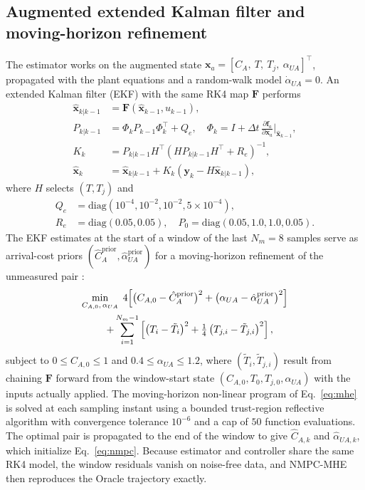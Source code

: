 \subsection{Augmented extended Kalman filter and moving-horizon refinement}
\label{subsec:mhe}
The estimator works on the augmented state $\mathbf{x}_a = [C_A,\ T,\ T_j,\ \alpha_{UA}]^\top$, propagated with the plant equations and a random-walk model $\dot\alpha_{UA} = 0$. An extended Kalman filter (EKF) with the same RK4 map $\mathbf{F}$ performs
\begin{align}
    \hat{\mathbf{x}}_{k|k-1} &= \mathbf{F}(\hat{\mathbf{x}}_{k-1}, u_{k-1}), \nonumber \\
    P_{k|k-1} &= \Phi_k P_{k-1} \Phi_k^\top + Q_e, \quad \Phi_k = I + \Delta t\,\frac{\partial \mathbf{f}_a}{\partial \mathbf{x}_a}\Big|_{\hat{\mathbf{x}}_{k-1}}, \nonumber \\
    K_k &= P_{k|k-1} H^\top \left(H P_{k|k-1} H^\top + R_e\right)^{-1}, \nonumber \\
    \hat{\mathbf{x}}_k &= \hat{\mathbf{x}}_{k|k-1} + K_k\left(\mathbf{y}_k - H\hat{\mathbf{x}}_{k|k-1}\right), \label{eq:ekf}
\end{align}
where $H$ selects $(T, T_j)$ and
\begin{align}
    Q_e &= \mathrm{diag}(10^{-4}, 10^{-2}, 10^{-2}, 5\times10^{-4}), \nonumber \\
    R_e &= \mathrm{diag}(0.05, 0.05), \quad P_0 = \mathrm{diag}(0.05, 1.0, 1.0, 0.05). \nonumber
\end{align}
The EKF estimates at the start of a window of the last $N_m = 8$ samples serve as arrival-cost priors $(\hat C_A^{\text{prior}}, \hat\alpha_{UA}^{\text{prior}})$ for a moving-horizon refinement of the unmeasured pair \cite{rao2003constrained}:
\begin{multline}
    \min_{C_{A,0},\,\alpha_{UA}} \; 4\Bigl[\bigl(C_{A,0} - \hat C_{A}^{\text{prior}}\bigr)^2 + \bigl(\alpha_{UA} - \hat\alpha_{UA}^{\text{prior}}\bigr)^2\Bigr] \\
    \quad + \sum_{i=1}^{N_m - 1} \left[\left(T_i - \tilde T_i\right)^2 + \tfrac14\left(T_{j,i} - \tilde T_{j,i}\right)^2\right],
    \label{eq:mhe}
\end{multline}
subject to $0 \le C_{A,0} \le 1$ and $0.4 \le \alpha_{UA} \le 1.2$, where $(\tilde T_i, \tilde T_{j,i})$ result from chaining $\mathbf{F}$ forward from the window-start state $(C_{A,0}, T_0, T_{j,0}, \alpha_{UA})$ with the inputs actually applied. The moving-horizon non-linear program of Eq.~\eqref{eq:mhe} is solved at each sampling instant using a bounded trust-region reflective algorithm with convergence tolerance $10^{-6}$ and a cap of $50$ function evaluations. The optimal pair is propagated to the end of the window to give $\hat C_{A,k}$ and $\hat\alpha_{UA,k}$, which initialize Eq.~\eqref{eq:nmpc}. Because estimator and controller share the same RK4 model, the window residuals vanish on noise-free data, and NMPC-MHE then reproduces the Oracle trajectory exactly.

